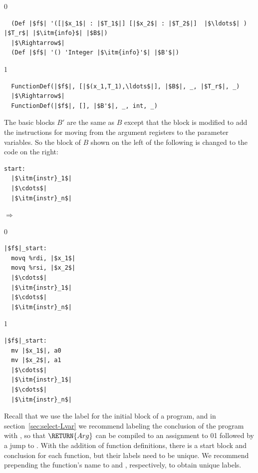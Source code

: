 \documentclass[7x10]{TimesAPriori_MIT}%
\def\racketEd{0}
\def\pythonEd{1}
\def\edition{1}
\def\xeightysixEd{0}
\def\riscvEd{1}
\def\architecture{1}
\newcommand\ifriscv[1]{\if\architecture\riscvEd{#1}\fi}
\newcommand\ifxeightsix[1]{\if\architecture\xeightysixEd{#1}\fi}
\newcommand{\pythonColor}[0]{}
\numberwithin{theorem}{chapter}
\numberwithin{definition}{chapter}
\numberwithin{equation}{chapter}
\begin{document}
{\if\edition\racketEd
\begin{lstlisting}
  (Def |$f$| '([|$x_1$| : |$T_1$|] [|$x_2$| : |$T_2$|]  |$\ldots$| ) |$T_r$| |$\itm{info}$| |$B$|)
  |$\Rightarrow$|
  (Def |$f$| '() 'Integer |$\itm{info}'$| |$B'$|)
\end{lstlisting}
\fi}
{\if\edition\pythonEd\pythonColor
\begin{lstlisting}
  FunctionDef(|$f$|, [|$(x_1,T_1),\ldots$|], |$B$|, _, |$T_r$|, _)
  |$\Rightarrow$|
  FunctionDef(|$f$|, [], |$B'$|, _, int, _)
\end{lstlisting}
\fi}
The basic blocks $B'$ are the same as $B$ except that the
 block is modified to add the instructions for moving from
the argument registers to the parameter variables. So the 
block of $B$ shown on the left of the following is changed to the code
on the right:
\begin{center}
\begin{minipage}{0.3\textwidth}
\begin{lstlisting}
start:
  |$\itm{instr}_1$|
  |$\cdots$|
  |$\itm{instr}_n$|
\end{lstlisting}
\end{minipage}
$\Rightarrow$
\begin{minipage}{0.3\textwidth}
  \if\architecture\xeightysixEd
\begin{lstlisting}
|$f$|_start:
  movq %rdi, |$x_1$|
  movq %rsi, |$x_2$|
  |$\cdots$|
  |$\itm{instr}_1$|
  |$\cdots$|
  |$\itm{instr}_n$|
\end{lstlisting}
  \fi
  \if\architecture\riscvEd
\begin{lstlisting}
|$f$|_start:
  mv |$x_1$|, a0
  mv |$x_2$|, a1
  |$\cdots$|
  |$\itm{instr}_1$|
  |$\cdots$|
  |$\itm{instr}_n$|
\end{lstlisting}
  \fi
\end{minipage}
\end{center}
Recall that we use the label  for the initial block of a
program, and in section~\ref{sec:select-Lvar} we recommend labeling
the conclusion of the program with , so that
$\RETURN{Arg}$ can be compiled to an assignment to
\ifxeightsix{}\ifriscv{} followed 
by a jump to . With the addition of function
definitions, there is a start block and conclusion for each function,
but their labels need to be unique. We recommend prepending the
function's name to  and , respectively,
to obtain unique labels.
\end{document}
